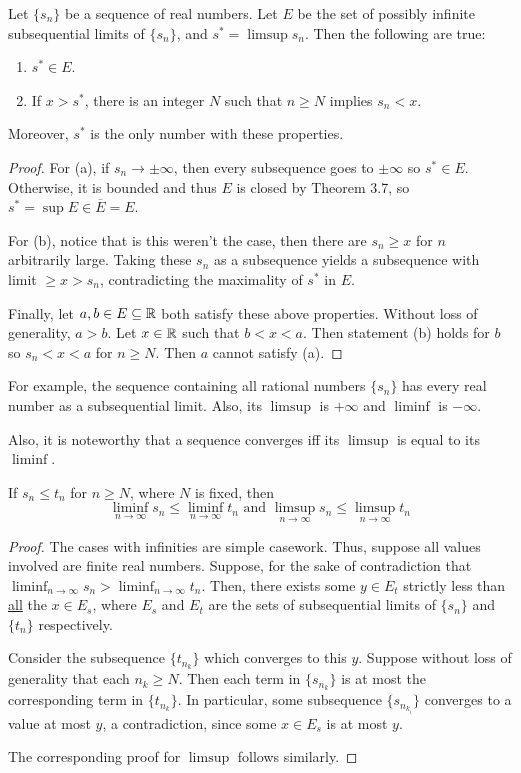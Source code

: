 \begin{theorem} %
Let $\{s_n\}$ be a sequence of real numbers. Let $E$ be the set of possibly infinite subsequential limits of $\{s_n\}$, and $s^* = \limsup s_n$. Then the following are true:

\begin{enumerate}
\item $s^* \in E$.
\item If $x > s^*$, there is an integer $N$ such that $n \ge N$ implies $s_n < x$. 
\end{enumerate}
Moreover, $s^*$ is the only number with these properties.

\begin{proof}
For (a), if $s_n \to \pm \infty$, then every subsequence goes to $\pm \infty$ so $s^* \in E$. Otherwise, it is bounded and thus $E$ is closed by Theorem 3.7, so $s^* = \sup E \in \overline{E} = E$. 

For (b), notice that is this weren't the case, then there are $s_n \ge x$ for $n$ arbitrarily large. Taking these $s_n$ as a subsequence yields a subsequence with limit $\ge x > s_n$, contradicting the maximality of $s^*$ in $E$.

Finally, let $a, b \in E \subseteq \mathbb{R}$ both satisfy these above properties. Without loss of generality, $a > b$. Let $x \in \mathbb{R}$ such that $b < x < a$. Then statement (b) holds for $b$ so $s_n < x < a$ for $n \ge N$. Then $a$ cannot satisfy (a).
\end{proof}
\end{theorem}

For example, the sequence containing all rational numbers $\{s_n\}$ has every real number as a subsequential limit. Also, its $\limsup$ is $+\infty$ and $\liminf$ is $-\infty$.

Also, it is noteworthy that a sequence converges iff its $\limsup$ is equal to its $\liminf$. 

\begin{theorem} %
If $s_n \le t_n$ for $n \ge N$, where $N$ is fixed, then
\[
	\liminf_{n \to \infty} s_n \le \liminf_{n \to \infty} t_n \text{ and } \limsup_{n \to \infty} s_n \le \limsup_{n \to \infty} t_n
\]

\begin{proof}
The cases with infinities are simple casework. Thus, suppose all values involved are finite real numbers. Suppose, for the sake of contradiction that $\liminf_{n \to \infty} s_n > \liminf_{n \to \infty} t_n$. Then, there exists some $y \in E_t$ strictly less than \underline{all} the $x \in E_s$, where $E_s$ and $E_t$ are the sets of subsequential limits of $\{s_n\}$ and $\{t_n\}$ respectively. 

Consider the subsequence $\{t_{n_k}\}$ which converges to this $y$. Suppose without loss of generality that each $n_k \ge N$. Then each term in $\{s_{n_k}\}$ is at most the corresponding term in $\{t_{n_k}\}$. In particular, some subsequence $\{s_{n_{k_i}}\}$ converges to a value at most $y$, a contradiction, since some $x \in E_s$ is at most $y$.

The corresponding proof for $\limsup$ follows similarly.
\end{proof}
\end{theorem}

